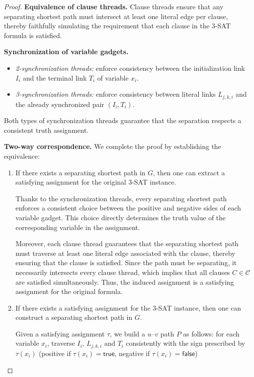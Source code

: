 \documentclass[journal ]{new-aiaa}
\numberwithin{equation}{section}
\theoremstyle{definition}
\theoremstyle{plain}
\theoremstyle{remark}
\begin{document}
\begin{proof}
\medskip
\noindent
\textbf{Equivalence of clause threads.}  
Clause threads ensure that any separating shortest path must intersect at least one literal edge per clause, thereby faithfully simulating the requirement that each clause in the \textsc{3-SAT} formula is satisfied.

\medskip
\noindent

\textbf{Synchronization of variable gadgets.}  
\begin{itemize}
    \item \emph{2-synchronization threads:} enforce consistency between the initialization link $I_i$ and the terminal link $T_i$ of variable $x_i$.  
    \item \emph{3-synchronization threads:} enforce consistency between literal links $L_{j,k,i}$ and the already synchronized pair $(I_i,T_i)$.  
\end{itemize}
Both types of synchronization threads guarantee that the separation respects a consistent truth assignment.

\medskip
\noindent
\medskip
\noindent
\textbf{Two-way correspondence.}  
We complete the proof by establishing the equivalence:
\begin{enumerate}[label=(\alph*)]
    \item If there exists a separating shortest path in $G$, then one can extract a satisfying assignment for the original \textsc{3-SAT} instance.  

    Thanks to the synchronization threads, every separating shortest path enforces a consistent choice between the positive and negative sides of each variable gadget.  
    This choice directly determines the truth value of the corresponding variable in the assignment.  
    
    Moreover, each clause thread guarantees that the separating shortest path must traverse at least one literal edge associated with the clause, thereby ensuring that the clause is satisfied.  
    Since the path must be separating, it necessarily intersects every clause thread, which implies that all clauses $C \in \mathcal{C}$ are satisfied simultaneously.  
    Thus, the induced assignment is a satisfying assignment for the original formula.
    
    \item If there exists a satisfying assignment for the \textsc{3-SAT} instance, then one can construct a separating shortest path in $G$.  

Given a satisfying assignment $\tau$, we build a $u$--$v$ path $P$ as follows: for each variable $x_i$, traverse $I_i$, $L_{j,k,i}$  and $T_i$ consistently with the sign prescribed by $\tau(x_i)$ (positive if $\tau(x_i)=\mathsf{true}$, negative if $\tau(x_i)=\mathsf{false}$)


\end{enumerate}
\end{proof}
\end{document}
